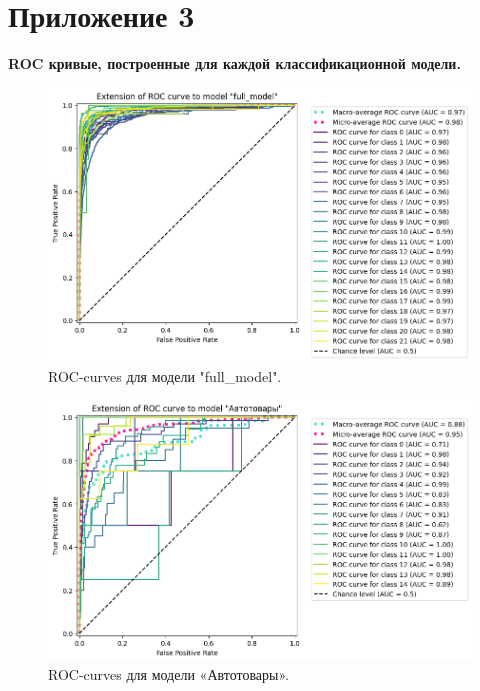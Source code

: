 \documentclass[a4paper,12pt]{extarticle}
\begin{document}
\newpage
\section{Приложение 3}
\label{appendix:roc_curves}
\textbf{\large{ROC кривые, построенные для каждой классификационной модели.}}

\begin{figure}[hbtp]
	\centering
	\includegraphics[scale=0.7]{roc_curves/roccurve_full_model.png}
	\caption{ROC-curves для модели "full\_model".}
	\label{fig:roccurve_full_model}
\end{figure}

\begin{figure}[hbtp]
	\centering
	\includegraphics[scale=0.7]{roc_curves/roccurve_Автотовары.png}
	\caption{ROC-curves для модели «Автотовары».}
	\label{fig:roccurve_Автотовары}
\end{figure}
\end{document}
